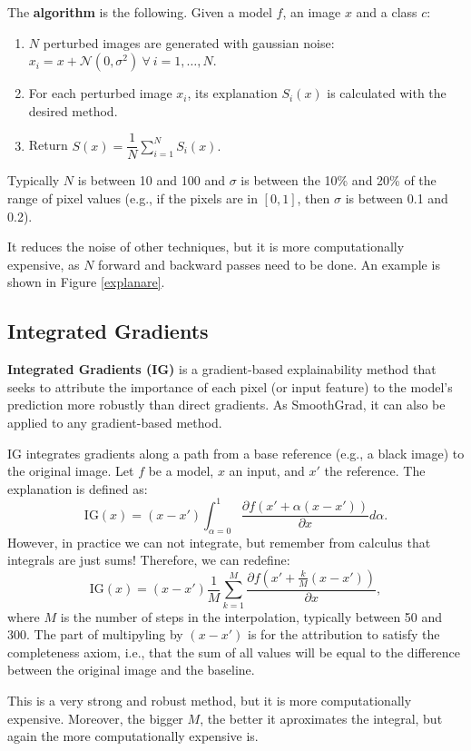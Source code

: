 The \textbf{algorithm} is the following. Given a model $f$, an image $x$ and a class $c$:
\begin{enumerate}
\item $N$ perturbed images are generated with gaussian noise: $x_i = x + \mathcal{N}\left(0, \sigma^2\right) ~ \forall ~ i = 1, \ldots, N$.
\item For each perturbed image $x_i$, its explanation $S_i(x)$ is calculated with the desired method.
\item Return $S(x)=\dfrac{1}{N}\sum_{i=1}^NS_i(x).$
\end{enumerate}
Typically $N$ is between 10 and 100 and $\sigma$ is between the 10\% and 20\% of the range of pixel values (e.g., if the pixels are in $[0, 1]$, then $\sigma$ is between 0.1 and 0.2).

It reduces the noise of other techniques, but it is more computationally expensive, as $N$ forward and backward passes need to be done. An example is shown in Figure \ref{explanare}. 
 
\subsection{Integrated Gradients}

\textbf{Integrated Gradients (IG)} is a gradient-based explainability method that seeks to attribute the importance of each pixel (or input feature) to the model's prediction more robustly than direct gradients. As SmoothGrad, it can also be applied to any gradient-based method.

IG integrates gradients along a path from a base reference (e.g., a black image) to the original image. Let $f$ be a model, $x$ an input, and $x'$ the reference. The explanation is defined as:
$$\text{IG}(x)=(x-x')\int_{\alpha=0}^1 \dfrac{\partial f(x'+\alpha(x-x'))}{\partial x}d\alpha.$$
However, in practice we can not integrate, but remember from calculus that integrals are just sums! Therefore, we can redefine:
$$\text{IG}(x)=(x-x')\dfrac{1}{M}\sum_{k=1}^M\dfrac{\partial f\left(x'+\frac{k}{M}\left(x-x'\right)\right)}{\partial x},$$
where $M$ is the number of steps in the interpolation, typically between 50 and 300. The part of multipyling by $(x-x')$ is for the attribution to satisfy the completeness axiom, i.e., that the sum of all values will be equal to the difference between the original image and the baseline.

This is a very strong and robust method, but it is more computationally expensive. Moreover, the bigger $M$, the better it aproximates the integral, but again the more computationally expensive is.

